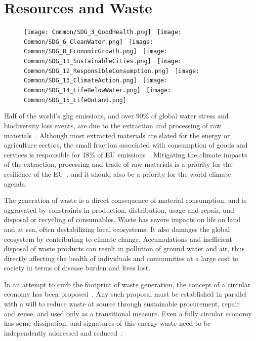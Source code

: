 \documentclass[../SustainableHEP.tex]{subfiles}
\begin{document}
\RaggedRight
\sloppy
\newpage


\section{Resources and Waste}
\label{sec:Waste}


\begin{figure}
\texttt{[image: Common/SDG\_3\_GoodHealth.png]}~
\texttt{[image: Common/SDG\_6\_CleanWater.png]}~
\texttt{[image: Common/SDG\_8\_EconomicGrowth.png]}~
\texttt{[image: Common/SDG\_11\_SustainableCities.png]}~
\texttt{[image: Common/SDG\_12\_ResponsibleConsumption.png]}~
\texttt{[image: Common/SDG\_13\_ClimateAction.png]}~
\texttt{[image: Common/SDG\_14\_LifeBelowWater.png]}~
\texttt{[image: Common/SDG\_15\_LifeOnLand.png]}
\end{figure}


\exSum

\noindent Half of the world's \acrshort{ghg} emissions, and over 90\% of global water stress and biodiversity loss events, are due to the extraction and processing of raw materials~\cite{EURaw}. Although most extracted materials are slated for the energy or agriculture sectors, the small fraction associated with consumption of goods and services is responsible for 18\% of EU emissions~\cite{EURaw}. Mitigating the climate impacts of the extraction, processing and trade of raw materials is a priority for the resilience of the EU~\cite{EURaw}, and it should also be a priority for the world climate agenda.

The generation of waste is a direct consequence of material consumption, and is aggravated by constraints in production, distribution, usage and repair, and disposal or recycling of consumables. Waste has severe impacts on life on land and at sea, often destabilizing local ecosystems.  It also damages the global ecosystem by contributing to climate change. Accumulations and inefficient disposal of waste products can result in pollution of ground water and air, thus directly affecting the health of individuals and communities at a large cost to society in terms of disease burden and lives lost. 

In an attempt to curb the footprint of waste generation, the concept of a circular economy has been  proposed~\cite{CircularEconomy}.  Any such proposal must be established in parallel with a will to reduce waste at source through sustainable procurement, repair and reuse, and used only as a transitional measure. Even a fully circular economy has some dissipation, and signatures of this energy waste need to be independently addressed and reduced~\cite{Forbes,SocialEurope,WRI}.
\end{document}
